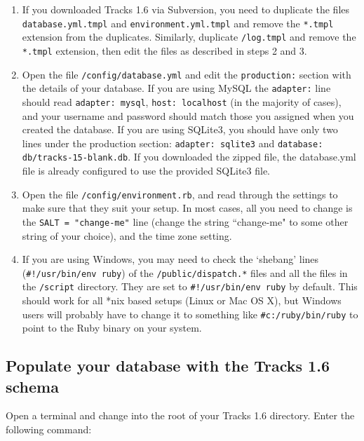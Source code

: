 \documentclass[10pt,twoside]{memoir}
\begin{document}
\begin{enumerate}


\item If you downloaded Tracks 1.6 via Subversion, you need to duplicate the files \texttt{database.yml.tmpl} and \texttt{environment.yml.tmpl} and remove the \texttt{*.tmpl} extension from the duplicates. Similarly, duplicate \texttt{/log.tmpl} and remove the \texttt{*.tmpl} extension, then edit the files as described in steps 2 and 3.

\item Open the file \texttt{/config/database.yml} and edit the \texttt{production:} section with the details of your database. If you are using MySQL the \texttt{adapter:} line should read \texttt{adapter: mysql}, \texttt{host: localhost} (in the majority of cases), and your username and password should match those you assigned when you created the database. If you are using SQLite3, you should have only two lines under the production section: \texttt{adapter: sqlite3} and \texttt{database: db/tracks-15-blank.db}. If you downloaded the zipped file, the database.yml file is already configured to use the provided SQLite3 file.

\item Open the file \texttt{/config/environment.rb}, and read through the settings to make sure that they suit your setup. In most cases, all you need to change is the \texttt{SALT = "change-me"} line (change the string ``change-me" to some other string of your choice), and the time zone setting.

\item If you are using Windows, you may need to check the `shebang' lines (\texttt{\#!/usr/bin/env ruby}) of the \texttt{/public/dispatch.*} files and all the files in the \texttt{/script} directory. They are set to \texttt{\#!/usr/bin/env ruby} by default. This should work for all *nix based setups (Linux or Mac OS X), but Windows users will probably have to change it to something like \texttt{\#c:/ruby/bin/ruby} to point to the Ruby binary on your system.
\end{enumerate}

\subsection{Populate your database with the Tracks 1.6 schema}
\label{rake_install}

Open a terminal and change into the root of your Tracks 1.6 directory. Enter the following command:
\end{document}
